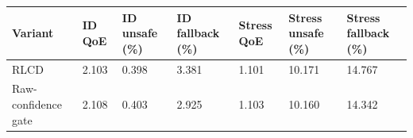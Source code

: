 \begin{tabular}{lllllll}
\toprule
Variant & ID QoE & ID unsafe (\%) & ID fallback (\%) & Stress QoE & Stress unsafe (\%) & Stress fallback (\%) \\
\midrule
RLCD & 2.103 & 0.398 & 3.381 & 1.101 & 10.171 & 14.767 \\
Raw-confidence gate & 2.108 & 0.403 & 2.925 & 1.103 & 10.160 & 14.342 \\
\bottomrule
\end{tabular}
